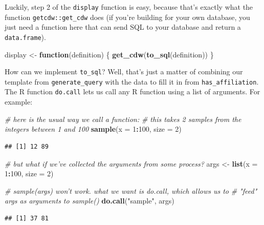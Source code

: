 \documentclass[]{book}
\newenvironment{Shaded}{\begin{snugshade}}{\end{snugshade}}
\newcommand{\CommentTok}[1]{\textcolor[rgb]{0.56,0.35,0.01}{\textit{#1}}}
\newcommand{\ControlFlowTok}[1]{\textcolor[rgb]{0.13,0.29,0.53}{\textbf{#1}}}
\newcommand{\DataTypeTok}[1]{\textcolor[rgb]{0.13,0.29,0.53}{#1}}
\newcommand{\DecValTok}[1]{\textcolor[rgb]{0.00,0.00,0.81}{#1}}
\newcommand{\KeywordTok}[1]{\textcolor[rgb]{0.13,0.29,0.53}{\textbf{#1}}}
\newcommand{\NormalTok}[1]{#1}
\newcommand{\OperatorTok}[1]{\textcolor[rgb]{0.81,0.36,0.00}{\textbf{#1}}}
\newcommand{\StringTok}[1]{\textcolor[rgb]{0.31,0.60,0.02}{#1}}
\begin{document}
Luckily, step 2 of the \texttt{display} function is easy, because that's exactly what the function \texttt{getcdw::get\_cdw} does (if you're building for your own database, you just need a function here that can send SQL to your database and return a \texttt{data.frame}).

\begin{Shaded}
\begin{Highlighting}[]
\NormalTok{display <-}\StringTok{ }\ControlFlowTok{function}\NormalTok{(definition) \{}
    \KeywordTok{get_cdw}\NormalTok{(}\KeywordTok{to_sql}\NormalTok{(definition))}
\NormalTok{\}}
\end{Highlighting}
\end{Shaded}

How can we implement \texttt{to\_sql}? Well, that's just a matter of combining our template from \texttt{generate\_query} with the data to fill it in from \texttt{has\_affiliation}. The R function \texttt{do.call} lets us call any R function using a list of arguments. For example:

\begin{Shaded}
\begin{Highlighting}[]
\CommentTok{# here is the usual way we call a function:}
\CommentTok{# this takes 2 samples from the integers between 1 and 100}
\KeywordTok{sample}\NormalTok{(}\DataTypeTok{x =} \DecValTok{1}\OperatorTok{:}\DecValTok{100}\NormalTok{, }\DataTypeTok{size =} \DecValTok{2}\NormalTok{)}
\end{Highlighting}
\end{Shaded}

\begin{verbatim}
## [1] 12 89
\end{verbatim}

\begin{Shaded}
\begin{Highlighting}[]
\CommentTok{# but what if we've collected the arguments from some process?}
\NormalTok{args <-}\StringTok{ }\KeywordTok{list}\NormalTok{(}\DataTypeTok{x =} \DecValTok{1}\OperatorTok{:}\DecValTok{100}\NormalTok{, }\DataTypeTok{size =} \DecValTok{2}\NormalTok{)}

\CommentTok{# sample(args) won't work. what we want is do.call, which allows us to }
\CommentTok{# "feed" args as arguments to sample()}
\KeywordTok{do.call}\NormalTok{(}\StringTok{"sample"}\NormalTok{, args)}
\end{Highlighting}
\end{Shaded}

\begin{verbatim}
## [1] 37 81
\end{verbatim}
\end{document}
